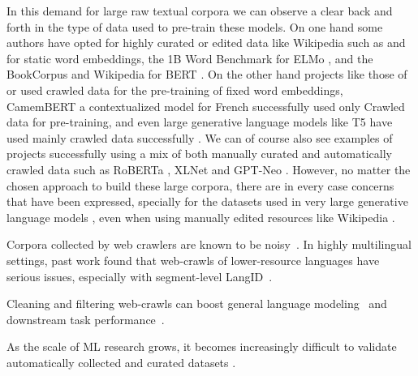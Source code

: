 In this demand for large raw textual corpora we can observe a clear back and forth in the type of data used to pre-train these models. On one hand some authors have opted for highly curated or edited data like Wikipedia such as  and  for static word embeddings, the 1B Word Benchmark \cite{chelba-etal-2014-one} for ELMo \cite{peters-etal-2018-deep}, and the BookCorpus \cite{zhu-etal-2015-aligning} and Wikipedia for BERT \cite{devlin-etal-2019-bert}. On the other hand projects like those of  or  used crawled data for the pre-training of fixed word embeddings, CamemBERT \cite{martin-etal-2020-camembert} a contextualized model for French successfully used only Crawled data for pre-training, and even large generative language models like T5 have used mainly crawled data successfully \cite{raffel-etal-2020-exploring}. We can of course also see examples of projects successfully using a mix of both manually curated and automatically crawled data such as RoBERTa \cite{liu-etal-2019-roberta}, XLNet \cite{yang-etal-2019-xlnet} and GPT-Neo \cite{black-etal-2021-gpt,gao-etal-2020-pile}. However, no matter the chosen approach to build these large corpora, there are in every case concerns that have been expressed, specially for the datasets used in very large generative language models \cite{bender-etal-2021-on}, even when using manually edited resources like Wikipedia \cite{barera-2020-mind}.

Corpora collected by web crawlers are known to be noisy~\citep{junczys-dowmunt-2019-microsoft,luccioni-viviano-2021-whats}. In highly multilingual settings, past work found that web-crawls of lower-resource languages have serious issues, especially with segment-level LangID~\citep{caswell-etal-2020-language}.

Cleaning and filtering web-crawls can boost general language modeling~\citep{gao-etal-2020-pile,brown-etal-2020-language,raffel-etal-2020-exploring} and downstream task performance~\citep{moore-lewis-2010-intelligent,rarrick-etal-2011-mt,xu-koehn-2017-zipporah,khayrallah-koehn-2018-impact,brown-etal-2020-language}.

As the scale of ML research grows, it becomes increasingly difficult to validate automatically collected and curated datasets \citep{biderman-etal-2020-pitfalls,birhane-etal-2021-large,bender-etal-2021-on}.

